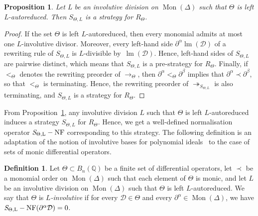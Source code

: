 \documentclass[10pt]{easychair}
\newtheorem{proposition}[theorem]{Proposition}
\theoremstyle{definition}
\newtheorem{definition}[theorem]{Definition}
\newcommand\D{\mathcal{D}}
\DeclareMathOperator{\lm}{lm}
\newcommand\Q{\mathbb{Q}}
\newcommand\Weyl[1]{B_{#1}(\Q)}
\newcommand\monBasis{\Mon(\Delta)}
\DeclareMathOperator{\Mon}{Mon}
\newcommand\rewTheta{\to_\Theta}
\newcommand\RTheta{R_{\Theta}}
\newcommand\SThetaL{S_{\Theta,L}}
\DeclareMathOperator{\SThetaLNF}{{\it S}_{\Theta,L}-NF}
\begin{document}
\begin{proposition}\label{prop:involutive_strategy}
  Let L be an involutive division on $\Mon(\Delta)$ such that $\Theta$ is
  left L-autoreduced. Then $\SThetaL$ is a strategy for $\RTheta$.  
\end{proposition}

\begin{proof}
  If the set $\Theta$ is left $L$-autoreduced, then every monomial admits
  at most one $L$-involutive divisor. Moreover, every left-hand side
  $\partial^\alpha\lm(\D)$ of a rewriting rule of $\SThetaL$ is
  $L$-divisible by~$\lm(\D)$. Hence, left-hand sides of $\SThetaL$ are
  pairwise distinct, which means that $\SThetaL$ is a pre-strategy for
  $\RTheta$. Finally, if $<_\Theta$ denotes the rewriting preorder of
  $\rewTheta$, then $\partial^\alpha<_\Theta\partial^\beta$ implies that
  $\partial^\alpha\prec\partial^\beta$, so that $<_\Theta$ is
  terminating. Hence, the rewriting preorder of $\twoheadrightarrow_{\SThetaL}$ is also
  terminating, and $\SThetaL$ is a strategy for $\RTheta$.
\end{proof}
\smallskip


From Proposition~\ref{prop:involutive_strategy}, any involutive division
$L$ such that $\Theta$ is left $L$-autoreduced induces a strategy
$\SThetaL$ for $\RTheta$. Hence, we get a well-defined normalisation
operator $\SThetaLNF$ corresponding to this strategy. The following
definition is an adaptation of the notion of involutive bases for
polynomial ideals~\cite{MR1627129} to the case of sets of monic
differential operators.
\smallskip

\begin{definition}
  Let $\Theta\subset\Weyl{n}$ be a finite set of differential operators,
  let $\prec$ be a monomial order on $\monBasis$ such that each element
  of $\Theta$ is monic, and let $L$ be an involutive division on
  $\Mon(\Delta)$ such that $\Theta$ is left $L$-autoreduced. We say that
  $\Theta$ is {\em $L$-involutive} if for every $\D\in\Theta$ and every
  $\partial^\alpha\in\Mon(\Delta)$, we have
  $\SThetaLNF(\partial^\alpha\D)=0$. 
\end{definition}
\smallskip
\end{document}
